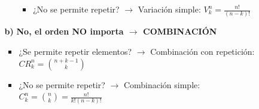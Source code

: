 \documentclass[12pt, letterpaper]{article}
\begin{document}
\begin{enumerate}[label=\bfseries Paso \arabic*:, wide]
\begin{itemize}
\begin{itemize}
\begin{itemize}
				                  \item ¿No se permite repetir? $\rightarrow$ Variación simple: $V_k^n = \frac{n!}{(n-k)!}$
			                  \end{itemize}
		            \end{itemize}
		      \item[\bfseries b)] \textbf{No, el orden NO importa $\rightarrow$ COMBINACIÓN}
		            \begin{itemize}
			            \item ¿Se permite repetir elementos? $\rightarrow$ Combinación con repetición: $CR_k^n = \binom{n+k-1}{k}$
			            \item ¿No se permite repetir? $\rightarrow$ Combinación simple: $C_k^n = \binom{n}{k} = \frac{n!}{k!(n-k)!}$
		            \end{itemize}
	      \end{itemize}
\end{enumerate}
\end{document}
